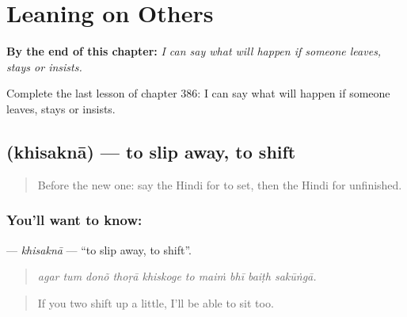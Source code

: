 
\chapter{Leaning on Others}
\label{ch:hi-leaning-on-others}

\begin{chapteropening}
\textbf{By the end of this chapter:} \emph{I can say what will happen if someone leaves, stays or insists.}

Complete the last lesson of chapter 386: I can say what will happen if someone leaves, stays or insists.
\end{chapteropening}

\section[\texorpdfstring{\hi{खिसकना} (khisaknā)}{खिसकना (khisaknā)}]{ (khisaknā) — to slip away, to shift}

\label{lesson:HI-C386-khisakna}



\begin{quote}
Before the new one: say the Hindi for to set, then the Hindi for unfinished.
\end{quote}

\subsection*{You'll want to know: }
\textbf{} — \emph{khisaknā} — \textquotedblleft{}to slip away, to shift\textquotedblright{}.

\begin{quote}
         
\end{quote}

\begin{quote}
\emph{agar tum donõ thoṛā khiskoge to maiṁ bhī baiṭh sakūṅgā.}
\end{quote}

\begin{quote}
If you two shift up a little, I'll be able to sit too.
\end{quote}

